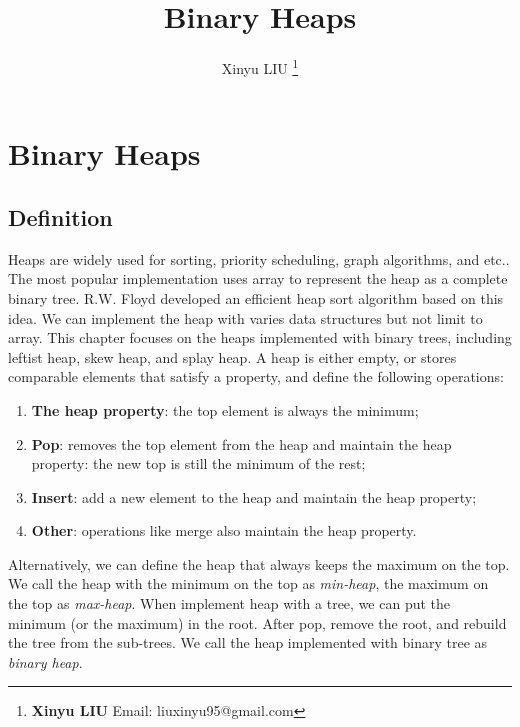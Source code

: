 \documentclass[b5paper]{article}
\begin{document}
\title{Binary Heaps}

\author{Xinyu LIU
\thanks{{\bfseries Xinyu LIU} \newline
  Email: liuxinyu95@gmail.com \newline}
  }

\maketitle
\fi


\ifx\wholebook\relax
\chapter{Binary Heaps}
\fi

\section{Definition}
\label{introduction} 

Heaps are widely used for sorting, priority scheduling, graph algorithms, and etc.\cite{wiki-heap}. The most popular implementation uses array to represent the heap as a complete binary tree\cite{CLRS}. R.W. Floyd developed an efficient heap sort algorithm based on this idea\cite{wiki-heapsort}\cite{rosetta-heapsort}. We can implement the heap with varies data structures but not limit to array. This chapter focuses on the heaps implemented with binary trees, including leftist heap, skew heap, and splay heap\cite{okasaki-book}. A heap is either empty, or stores comparable elements that satisfy a property, and define the following operations:

\begin{enumerate}
\item \textbf{The heap property}: the top element is always the minimum;
\item \textbf{Pop}: removes the top element from the heap and maintain the heap property: the new top is still the minimum of the rest;
\item \textbf{Insert}: add a new element to the heap and maintain the heap property;
\item \textbf{Other}: operations like merge also maintain the heap property.
\end{enumerate}

Alternatively, we can define the heap that always keeps the maximum on the top. We call the heap with the minimum on the top as {\em min-heap}, the maximum on the top as {\em max-heap}. When implement heap with a tree, we can put the minimum (or the maximum) in the root. After pop, remove the root, and rebuild the tree from the sub-trees. We call the heap implemented with binary tree as {\em binary heap}.
\end{document}
